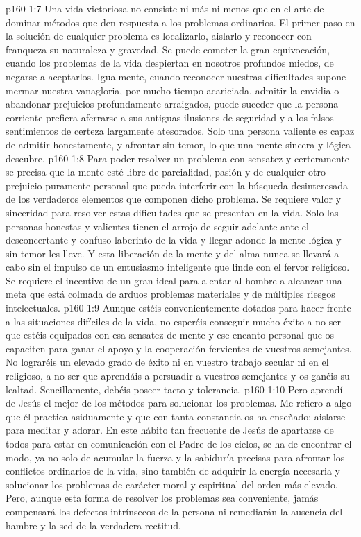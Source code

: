 \vs p160 1:7 Una vida victoriosa no consiste ni más ni menos que en el arte de dominar métodos que den respuesta a los problemas ordinarios. El primer paso en la solución de cualquier problema es localizarlo, aislarlo y reconocer con franqueza su naturaleza y gravedad. Se puede cometer la gran equivocación, cuando los problemas de la vida despiertan en nosotros profundos miedos, de negarse a aceptarlos. Igualmente, cuando reconocer nuestras dificultades supone mermar nuestra vanagloria, por mucho tiempo acariciada, admitir la envidia o abandonar prejuicios profundamente arraigados, puede suceder que la persona corriente prefiera aferrarse a sus antiguas ilusiones de seguridad y a los falsos sentimientos de certeza largamente atesorados. Solo una persona valiente es capaz de admitir honestamente, y afrontar sin temor, lo que una mente sincera y lógica descubre.
\vs p160 1:8 Para poder resolver un problema con sensatez y certeramente se precisa que la mente esté libre de parcialidad, pasión y de cualquier otro prejuicio puramente personal que pueda interferir con la búsqueda desinteresada de los verdaderos elementos que componen dicho problema. Se requiere valor y sinceridad para resolver estas dificultades que se presentan en la vida. Solo las personas honestas y valientes tienen el arrojo de seguir adelante ante el desconcertante y confuso laberinto de la vida y llegar adonde la mente lógica y sin temor les lleve. Y esta liberación de la mente y del alma nunca se llevará a cabo sin el impulso de un entusiasmo inteligente que linde con el fervor religioso. Se requiere el incentivo de un gran ideal para alentar al hombre a alcanzar una meta que está colmada de arduos problemas materiales y de múltiples riesgos intelectuales.
\vs p160 1:9 Aunque estéis convenientemente dotados para hacer frente a las situaciones difíciles de la vida, no esperéis conseguir mucho éxito a no ser que estéis equipados con esa sensatez de mente y ese encanto personal que os capaciten para ganar el apoyo y la cooperación fervientes de vuestros semejantes. No lograréis un elevado grado de éxito ni en vuestro trabajo secular ni en el religioso, a no ser que aprendáis a persuadir a vuestros semejantes y os ganéis su lealtad. Sencillamente, debéis poseer tacto y tolerancia.
\vs p160 1:10 \pc Pero aprendí de Jesús el mejor de los métodos para solucionar los problemas. Me refiero a algo que él practica asiduamente y que con tanta constancia os ha enseñado: aislarse para meditar y adorar. En este hábito tan frecuente de Jesús de apartarse de todos para estar en comunicación con el Padre de los cielos, se ha de encontrar el modo, ya no solo de acumular la fuerza y la sabiduría precisas para afrontar los conflictos ordinarios de la vida, sino también de adquirir la energía necesaria y solucionar los problemas de carácter moral y espiritual del orden más elevado. Pero, aunque esta forma de resolver los problemas sea conveniente, jamás compensará los defectos intrínsecos de la persona ni remediarán la ausencia del hambre y la sed de la verdadera rectitud.
